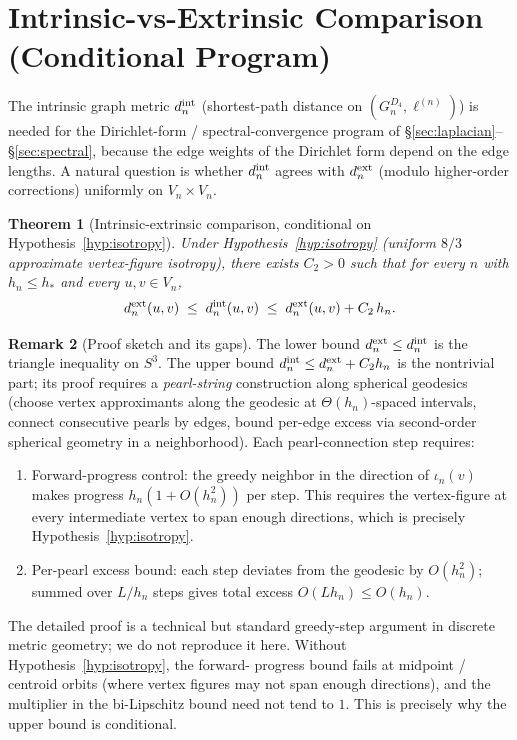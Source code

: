 \documentclass[11pt, a4paper]{amsart}
\newtheorem{theorem}{Theorem}[section]
\theoremstyle{definition}
\newtheorem{remark}[theorem]{Remark}
\begin{document}
\section{Intrinsic-vs-Extrinsic Comparison (Conditional Program)}
\label{sec:conditional-bilipschitz}

The intrinsic graph metric $d_n^{\rm int}$ (shortest-path
distance on $(G_n^{D_4}, \ell^{(n)})$) is needed for the
Dirichlet-form / spectral-convergence program of
\S\ref{sec:laplacian}--\S\ref{sec:spectral}, because the edge
weights of the Dirichlet form depend on the edge lengths. A
natural question is whether $d_n^{\rm int}$ agrees with
$d_n^{\rm ext}$ (modulo higher-order corrections) uniformly on
$V_n \times V_n$.

\begin{theorem}[Intrinsic-extrinsic comparison,
  conditional on Hypothesis~\ref{hyp:isotropy}]
\label{thm:intrinsic-extrinsic}
Under Hypothesis~\ref{hyp:isotropy} (uniform $8/3$ approximate
vertex-figure isotropy), there exists $C_2 > 0$ such that for
every $n$ with $h_n \leq h_\ast$ and every $u, v \in V_n$,
\[
  d_n^{\rm ext}(u, v) \;\leq\; d_n^{\rm int}(u, v)
    \;\leq\; d_n^{\rm ext}(u, v) + C_2\,h_n.
\]
\end{theorem}

\begin{remark}[Proof sketch and its gaps]
\label{rmk:bilipschitz-sketch}
The lower bound $d_n^{\rm ext} \leq d_n^{\rm int}$ is the
triangle inequality on $S^3$. The upper bound
$d_n^{\rm int} \leq d_n^{\rm ext} + C_2 h_n$ is the nontrivial
part; its proof requires a \emph{pearl-string} construction
along spherical geodesics (choose vertex approximants along
the geodesic at $\Theta(h_n)$-spaced intervals, connect
consecutive pearls by edges, bound per-edge excess via
second-order spherical geometry in a neighborhood). Each
pearl-connection step requires:
\begin{enumerate}
\item Forward-progress control: the greedy neighbor in the
  direction of $\iota_n(v)$ makes progress $h_n(1 + O(h_n^2))$
  per step. This requires the vertex-figure at every
  intermediate vertex to span enough directions, which is
  precisely Hypothesis~\ref{hyp:isotropy}.
\item Per-pearl excess bound: each step deviates from the
  geodesic by $O(h_n^2)$; summed over $L/h_n$ steps gives total
  excess $O(L h_n) \leq O(h_n)$.
\end{enumerate}
The detailed proof is a technical but standard greedy-step
argument in discrete metric geometry; we do not reproduce it
here. Without Hypothesis~\ref{hyp:isotropy}, the forward-
progress bound fails at midpoint / centroid orbits (where
vertex figures may not span enough directions), and the
multiplier in the bi-Lipschitz bound need not tend to $1$.
This is precisely why the upper bound is conditional.
\end{remark}
\end{document}

